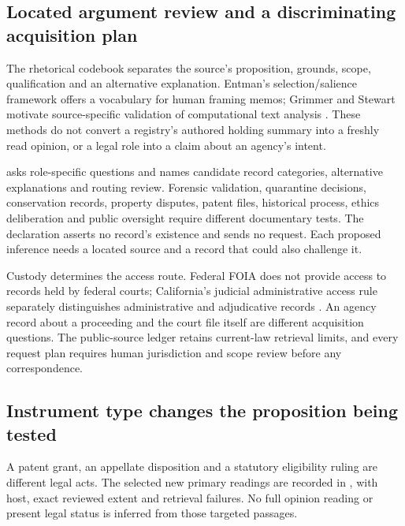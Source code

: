 \documentclass[
  english,
]{article}
\begin{document}
\subsection{Located argument review and a discriminating acquisition
plan}\label{located-argument-review-and-a-discriminating-acquisition-plan}

The rhetorical codebook separates the source's proposition, grounds,
scope, qualification and an alternative explanation. Entman's
selection/salience framework offers a vocabulary for human framing
memos; Grimmer and Stewart motivate source-specific validation of
computational text analysis
\citep{methods_entman_framing, methods_grimmer_stewart}. These methods
do not convert a registry's authored holding summary into a freshly read
opinion, or a legal role into a claim about an agency's intent.

 asks role-specific questions and
names candidate record categories, alternative explanations and routing
review. Forensic validation, quarantine decisions, conservation records,
property disputes, patent files, historical process, ethics deliberation
and public oversight require different documentary tests. The
declaration asserts no record's existence and sends no request. Each
proposed inference needs a located source and a record that could also
challenge it.

Custody determines the access route. Federal FOIA does not provide
access to records held by federal courts; California's judicial
administrative access rule separately distinguishes administrative and
adjudicative records
\citep{methods_doj_foia_scope, methods_ca_judicial_access}. An agency
record about a proceeding and the court file itself are different
acquisition questions. The public-source ledger retains current-law
retrieval limits, and every request plan requires human jurisdiction and
scope review before any correspondence.

\subsection{Instrument type changes the proposition being
tested}\label{instrument-type-changes-the-proposition-being-tested}

A patent grant, an appellate disposition and a statutory eligibility
ruling are different legal acts. The selected new primary readings are
recorded in , with host,
exact reviewed extent and retrieval failures. No full opinion reading or
present legal status is inferred from those targeted passages.
\end{document}
